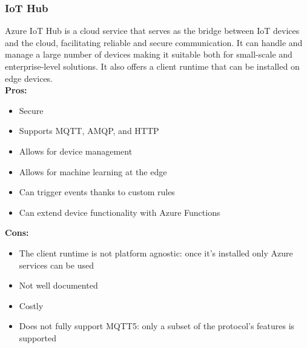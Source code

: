         \subsubsection{IoT Hub}
        \label{azure:iot-hub}
 Azure IoT Hub is a cloud service that serves as the bridge between IoT devices and the cloud, facilitating reliable and secure communication.
 It can handle and manage a large number of devices making it suitable both for small-scale and enterprise-level solutions.
 It also offers a client runtime that can be installed on edge devices.\\
        \textbf{Pros:}
        \begin{itemize}
            \item Secure
            \item Supports MQTT, AMQP, and HTTP
            \item Allows for device management
            \item Allows for machine learning at the edge
            \item Can trigger events thanks to custom rules
            \item Can extend device functionality with Azure Functions
        \end{itemize}
        \textbf{Cons:}
        \begin{itemize}
            \item The client runtime is not platform agnostic: once it's installed only Azure services can be used
            \item Not well documented
            \item Costly
            \item Does not fully support MQTT5: only a subset of the protocol's features is supported
        \end{itemize}

